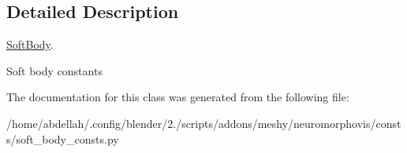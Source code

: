 \subsection{Detailed Description}
\hyperlink{classmeshy_1_1neuromorphovis_1_1consts_1_1soft__body__consts_1_1SoftBody}{Soft\+Body}. 

\begin{DoxyVerb}Soft body constants
\end{DoxyVerb}
 

The documentation for this class was generated from the following file\+:\begin{DoxyCompactItemize}
\item 
/home/abdellah/.\+config/blender/2./scripts/addons/meshy/neuromorphovis/consts/soft\+\_\+body\+\_\+consts.\+py\end{DoxyCompactItemize}

